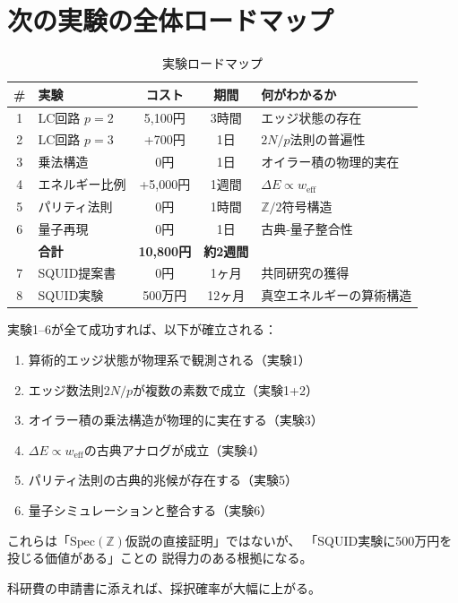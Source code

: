 \documentclass[12pt,a4paper]{article}
\newcommand{\Spec}{\mathrm{Spec}}
\begin{document}
\section{次の実験の全体ロードマップ}

\begin{table}[h]
\centering
\caption{実験ロードマップ}
\small
\begin{tabular}{@{}clccl@{}}
\toprule
\# & 実験 & コスト & 期間 & 何がわかるか \\
\midrule
1 & LC回路 $p=2$ & 5,100円 & 3時間 & エッジ状態の存在 \\
2 & LC回路 $p=3$ & +700円 & 1日 & $2N/p$法則の普遍性 \\
3 & 乗法構造 & 0円 & 1日 & オイラー積の物理的実在 \\
4 & エネルギー比例 & +5,000円 & 1週間 & $\Delta E \propto w_{\mathrm{eff}}$ \\
5 & パリティ法則 & 0円 & 1時間 & $\mathbb{Z}/2$符号構造 \\
6 & 量子再現 & 0円 & 1日 & 古典-量子整合性 \\
\midrule
& \textbf{合計} & \textbf{10,800円} & \textbf{約2週間} & \\
\midrule
\midrule
7 & SQUID提案書 & 0円 & 1ヶ月 & 共同研究の獲得 \\
8 & SQUID実験 & 500万円 & 12ヶ月 & 真空エネルギーの算術構造 \\
\bottomrule
\end{tabular}
\end{table}

\begin{keybox}[10,800円で到達できる地点]
実験1--6が全て成功すれば、以下が確立される：
\begin{enumerate}
\item 算術的エッジ状態が物理系で観測される（実験1）
\item エッジ数法則$2N/p$が複数の素数で成立（実験1+2）
\item オイラー積の乗法構造が物理的に実在する（実験3）
\item $\Delta E \propto w_{\mathrm{eff}}$の古典アナログが成立（実験4）
\item パリティ法則の古典的兆候が存在する（実験5）
\item 量子シミュレーションと整合する（実験6）
\end{enumerate}

これらは「$\Spec(\mathbb{Z})$仮説の直接証明」ではないが、
「SQUID実験に500万円を投じる価値がある」ことの
説得力のある根拠になる。

科研費の申請書に添えれば、採択確率が大幅に上がる。
\end{keybox}
\end{document}
